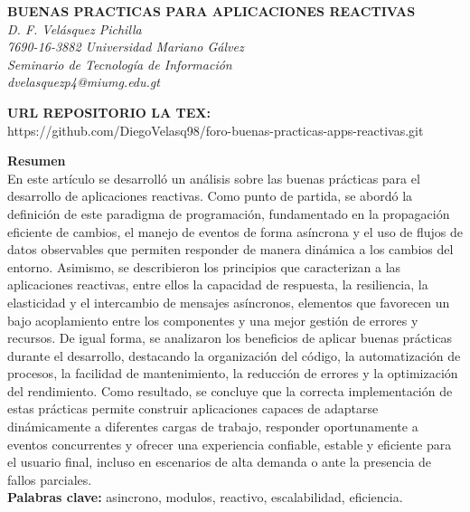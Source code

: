 \documentclass[12pt]{article}
\begin{document}
\begin{center}
    {\bfseries\uppercase{Buenas practicas para aplicaciones reactivas}} \\
\textit{D. F. Velásquez Pichilla}\\
\textit{7690-16-3882 Universidad Mariano Gálvez}\\
\textit{Seminario de Tecnología de Información}\\
\textit{dvelasquezp4@miumg.edu.gt}\\
\end{center}

\textbf{URL REPOSITORIO LA TEX: } \\
https://github.com/DiegoVelasq98/foro-buenas-practicas-apps-reactivas.git

\vspace{1em}
\noindent\textbf{Resumen}\\
En este artículo se desarrolló un análisis sobre las buenas prácticas para el desarrollo de aplicaciones reactivas. Como punto de partida, se abordó la definición de este paradigma de programación, fundamentado en la propagación eficiente de cambios, el manejo de eventos de forma asíncrona y el uso de flujos de datos observables que permiten responder de manera dinámica a los cambios del entorno. Asimismo, se describieron los principios que caracterizan a las aplicaciones reactivas, entre ellos la capacidad de respuesta, la resiliencia, la elasticidad y el intercambio de mensajes asíncronos, elementos que favorecen un bajo acoplamiento entre los componentes y una mejor gestión de errores y recursos. De igual forma, se analizaron los beneficios de aplicar buenas prácticas durante el desarrollo, destacando la organización del código, la automatización de procesos, la facilidad de mantenimiento, la reducción de errores y la optimización del rendimiento. Como resultado, se concluye que la correcta implementación de estas prácticas permite construir aplicaciones capaces de adaptarse dinámicamente a diferentes cargas de trabajo, responder oportunamente a eventos concurrentes y ofrecer una experiencia confiable, estable y eficiente para el usuario final, incluso en escenarios de alta demanda o ante la presencia de fallos parciales.
 \\

\noindent\textbf{Palabras clave: } asincrono, modulos, reactivo, escalabilidad, eficiencia.
\end{document}
